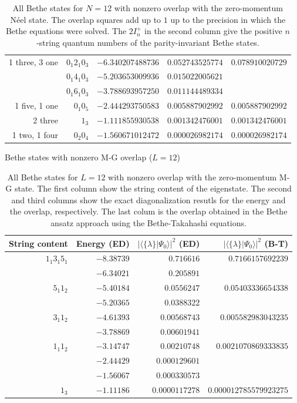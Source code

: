 \documentclass[11pt]{iopart}
\begin{document}
\begin{table}[h]
\begin{tabular}{rrrrr}
    \midrule
1 three, 3 one &$0_1 2_1 0_3$ & $-6.340207488736$ & $0.052743525774$ & $0.078910020729$ \\
  &$0_1 4_1 0_3$ & $-5.203653009936$ & $0.015022005621$ \\
  &$0_1 6_1 0_3$ & $-3.788693957250$ & $0.011144489334$ \\
      \midrule
1 five, 1 one &$0_1 0_5$ & $-2.444293750583$ & $0.005887902992$ & $0.005887902992$ \\
      \midrule
2 three &$1_3$ & $-1.111855930538$ & $0.001342476001$ & $0.001342476001$ \\
      \midrule
1 two, 1 four &$0_2 0_4$ & $-1.560671012472$ & $0.000026982174$ & $0.000026982174$ \\
  \bottomrule
 \end{tabular}
\caption{All Bethe states for $N=12$ with nonzero overlap with the zero-momentum N\'eel state. The 
overlap squares add up to $1$ up to the precision in which the Bethe equations were solved. The 
$2I^+_n$ in the second column give the positive $n$-string quantum numbers of the parity-invariant 
Bethe states.}
\label{table:RV:sumruleN12}
\end{table}

\begin{table}[h]
\scriptsize
\centering
Bethe states with nonzero M-G overlap ($L=12$)\\[1ex]
\begin{tabular}{rrrr}
String content & Energy (ED) & $|\langle \{\lambda\}| \Psi_0 \rangle|^2$ (ED) & $|\langle \{\lambda\}| \Psi_0 \rangle|^2$ (B-T) \\[0.3em]
\toprule
$1_1 3_1 5_1$ & $-8.38739$  & $0.716616$     &  $0.7166157692239$\\
              & $-6.34021$  & $0.205891$     &  \\
$5_1 1_2$     & $-5.40184$  & $0.0556247$    & $0.05403336654338$\\
              & $-5.20365$  & $0.0388322$    & \\
$3_1 1_2$     & $-4.61393$  & $0.00568743$   & $0.005582983043235$\\
              & $-3.78869$  & $0.00601941$   & \\
$1_1 1_2$     & $-3.14747$  & $0.00210748$   & $0.0021070869333835$\\
              & $-2.44429$  & $0.000129601$  & \\
              & $-1.56067$  & $0.000330573$  & \\
$1_3$         & $-1.11186$  & $0.0000117278$ & $0.000012785579923275$\\
\bottomrule
\end{tabular}
\caption{All Bethe states for $L=12$ with nonzero overlap with the zero-momentum 
 M-G state. The first column show the string content of the eigenstate. The second 
 and third columns show the exact diagonalization resutls for the energy and the 
 overlap, respectively. The last colum is the overlap obtained in the Bethe ansatz 
 approach using the Bethe-Takahashi equations.
}
\label{table:RV:sumruleN12}
\end{table}
\end{document}
